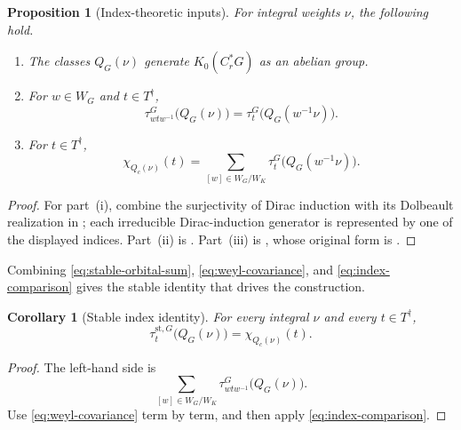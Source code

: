 \documentclass[11pt]{amsart}
\newtheorem{proposition}[theorem]{Proposition}
\newtheorem{corollary}[theorem]{Corollary}
\theoremstyle{definition}
\theoremstyle{remark}
\newcommand{\Cr}{C_r^*}
\newcommand{\st}{\mathrm{st}}
\begin{document}
\begin{proposition}[Index-theoretic inputs]\label{prop:index-inputs}
For integral weights $\nu$, the following hold.
\begin{enumerate}[label=\textup{(\roman*)}]
\item The classes $Q_G(\nu)$ generate $K_0(\Cr G)$ as an abelian group.
\item For $w\in W_G$ and $t\in T^\dagger$,
\begin{equation}\label{eq:weyl-covariance}
  \tau_{wtw^{-1}}^G\bigl(Q_G(\nu)\bigr)
  =\tau_t^G\bigl(Q_G(w^{-1}\nu)\bigr).
\end{equation}
\item For $t\in T^\dagger$,
\begin{equation}\label{eq:index-comparison}
  \chi_{Q_c(\nu)}(t)
  =\sum_{[w]\in W_G/W_K}
     \tau_t^G\bigl(Q_G(w^{-1}\nu)\bigr).
\end{equation}
\end{enumerate}
\end{proposition}

\begin{proof}
For part~(i), combine the surjectivity of Dirac induction with its Dolbeault realization in \cite[Proposition~6.5]{HochsWang2019Orbital}; each irreducible Dirac-induction generator is represented by one of the displayed indices.  Part~(ii) is \cite[Lemma~6.6]{HochsWang2019Orbital}.  Part~(iii) is \cite[Theorem~6.4]{HochsWang2019Orbital}, whose original form is \cite[Equation~(3.6)]{HochsWang2018Shelstad}.
\end{proof}

Combining \eqref{eq:stable-orbital-sum}, \eqref{eq:weyl-covariance}, and \eqref{eq:index-comparison} gives the stable identity that drives the construction.

\begin{corollary}[Stable index identity]\label{cor:stable-index}
For every integral $\nu$ and every $t\in T^\dagger$,
\begin{equation}\label{eq:stable-index}
  \tau_t^{\st,G}\bigl(Q_G(\nu)\bigr)
  =\chi_{Q_c(\nu)}(t).
\end{equation}
\end{corollary}

\begin{proof}
The left-hand side is
\[
  \sum_{[w]\in W_G/W_K}
  \tau_{wtw^{-1}}^G\bigl(Q_G(\nu)\bigr).
\]
Use \eqref{eq:weyl-covariance} term by term, and then apply \eqref{eq:index-comparison}.
\end{proof}
\end{document}

